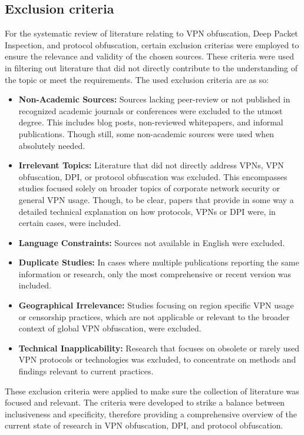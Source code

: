 \documentclass[12pt, fleqn, a4paper]{article}
\begin{document}
\subsection{Exclusion criteria}
For the systematic review of literature relating to VPN obfuscation, Deep Packet Inspection, and protocol obfuscation, certain exclusion criterias were employed to ensure the relevance and validity of the chosen sources. These criteria were used in filtering out literature that did not directly contribute to the understanding of the topic or meet the requirements. The used exclusion criteria are as so:
\begin{itemize}
\item \textbf{Non-Academic Sources:} Sources lacking peer-review or not published in recognized academic journals or conferences were excluded to the utmost degree. This includes blog posts, non-reviewed whitepapers, and informal publications. Though still, some non-academic sources were used when absolutely needed.
\item \textbf{Irrelevant Topics:} Literature that did not directly address VPNs, VPN obfuscation, DPI, or protocol obfuscation was excluded. This encompasses studies focused solely on broader topics of corporate network security or general VPN usage. Though, to be clear, papers that provide in some way a detailed technical explanation on how protocols, VPNs or DPI were, in certain cases, were included. 
\item \textbf{Language Constraints:} Sources not available in English were excluded.
\item \textbf{Duplicate Studies:} In cases where multiple publications reporting the same information or research, only the most comprehensive or recent version was included.
\item \textbf{Geographical Irrelevance:} Studies focusing on region specific VPN usage or censorship practices, which are not applicable or relevant to the broader context of global VPN obfuscation, were excluded.
\item \textbf{Technical Inapplicability:} Research that focuses on obsolete or rarely used VPN protocols or technologies was excluded, to concentrate on methods and findings relevant to current practices.
\end{itemize}
These exclusion criteria were applied to make sure the collection of literature was focused and relevant. The criteria were developed to strike a balance between inclusiveness and specificity, therefore providing a comprehensive overview of the current state of research in VPN obfuscation, DPI, and protocol obfuscation.
\end{document}
